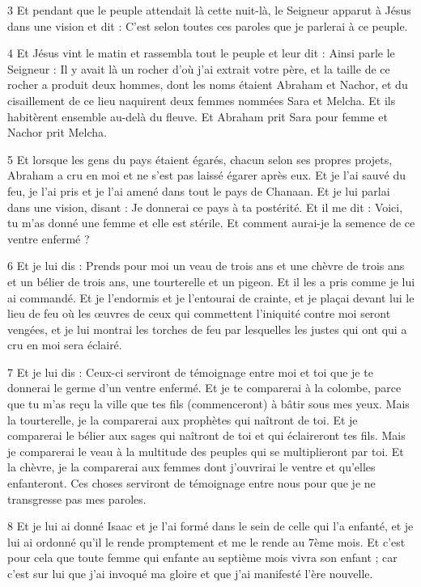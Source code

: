 \par 3 Et pendant que le peuple attendait là cette nuit-là, le Seigneur apparut à Jésus dans une vision et dit : C'est selon toutes ces paroles que je parlerai à ce peuple.

\par 4 Et Jésus vint le matin et rassembla tout le peuple et leur dit : Ainsi parle le Seigneur : Il y avait là un rocher d'où j'ai extrait votre père, et la taille de ce rocher a produit deux hommes, dont les noms étaient Abraham et Nachor, et du cisaillement de ce lieu naquirent deux femmes nommées Sara et Melcha. Et ils habitèrent ensemble au-delà du fleuve. Et Abraham prit Sara pour femme et Nachor prit Melcha.

\par 5 Et lorsque les gens du pays étaient égarés, chacun selon ses propres projets, Abraham a cru en moi et ne s'est pas laissé égarer après eux. Et je l'ai sauvé du feu, je l'ai pris et je l'ai amené dans tout le pays de Chanaan. Et je lui parlai dans une vision, disant : Je donnerai ce pays à ta postérité. Et il me dit : Voici, tu m'as donné une femme et elle est stérile. Et comment aurai-je la semence de ce ventre enfermé ?

\par 6 Et je lui dis : Prends pour moi un veau de trois ans et une chèvre de trois ans et un bélier de trois ans, une tourterelle et un pigeon. Et il les a pris comme je lui ai commandé. Et je l'endormis et je l'entourai de crainte, et je plaçai devant lui le lieu de feu où les œuvres de ceux qui commettent l'iniquité contre moi seront vengées, et je lui montrai les torches de feu par lesquelles les justes qui ont qui a cru en moi sera éclairé.

\par 7 Et je lui dis : Ceux-ci serviront de témoignage entre moi et toi que je te donnerai le germe d'un ventre enfermé. Et je te comparerai à la colombe, parce que tu m'as reçu la ville que tes fils (commenceront) à bâtir sous mes yeux. Mais la tourterelle, je la comparerai aux prophètes qui naîtront de toi. Et je comparerai le bélier aux sages qui naîtront de toi et qui éclaireront tes fils. Mais je comparerai le veau à la multitude des peuples qui se multiplieront par toi. Et la chèvre, je la comparerai aux femmes dont j'ouvrirai le ventre et qu'elles enfanteront. Ces choses serviront de témoignage entre nous pour que je ne transgresse pas mes paroles.

\par 8 Et je lui ai donné Isaac et je l'ai formé dans le sein de celle qui l'a enfanté, et je lui ai ordonné qu'il le rende promptement et me le rende au 7ème mois. Et c’est pour cela que toute femme qui enfante au septième mois vivra son enfant ; car c’est sur lui que j’ai invoqué ma gloire et que j’ai manifesté l’ère nouvelle.

